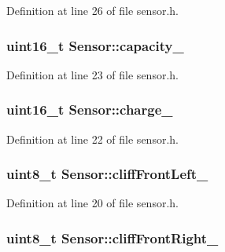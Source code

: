Definition at line 26 of file sensor.\+h.

\subsubsection[{\texorpdfstring{capacity\+\_\+}{capacity_}}]{\setlength{\rightskip}{0pt plus 5cm}uint16\+\_\+t Sensor\+::capacity\+\_\+}\hypertarget{class_sensor_a7facd4c626717aa8dceebcd763df339f}{}\label{class_sensor_a7facd4c626717aa8dceebcd763df339f}


Definition at line 23 of file sensor.\+h.

\subsubsection[{\texorpdfstring{charge\+\_\+}{charge_}}]{\setlength{\rightskip}{0pt plus 5cm}uint16\+\_\+t Sensor\+::charge\+\_\+}\hypertarget{class_sensor_a2ab14861ceb9304f9b6dc7a8eab5e156}{}\label{class_sensor_a2ab14861ceb9304f9b6dc7a8eab5e156}


Definition at line 22 of file sensor.\+h.

\subsubsection[{\texorpdfstring{cliff\+Front\+Left\+\_\+}{cliffFrontLeft_}}]{\setlength{\rightskip}{0pt plus 5cm}uint8\+\_\+t Sensor\+::cliff\+Front\+Left\+\_\+}\hypertarget{class_sensor_ab1a85642aa3468803b02d8ebfa6e1c4d}{}\label{class_sensor_ab1a85642aa3468803b02d8ebfa6e1c4d}


Definition at line 20 of file sensor.\+h.

\subsubsection[{\texorpdfstring{cliff\+Front\+Right\+\_\+}{cliffFrontRight_}}]{\setlength{\rightskip}{0pt plus 5cm}uint8\+\_\+t Sensor\+::cliff\+Front\+Right\+\_\+}\hypertarget{class_sensor_a5bff8fe2bb2ee243c3c62646d8111d46}{}\label{class_sensor_a5bff8fe2bb2ee243c3c62646d8111d46}


